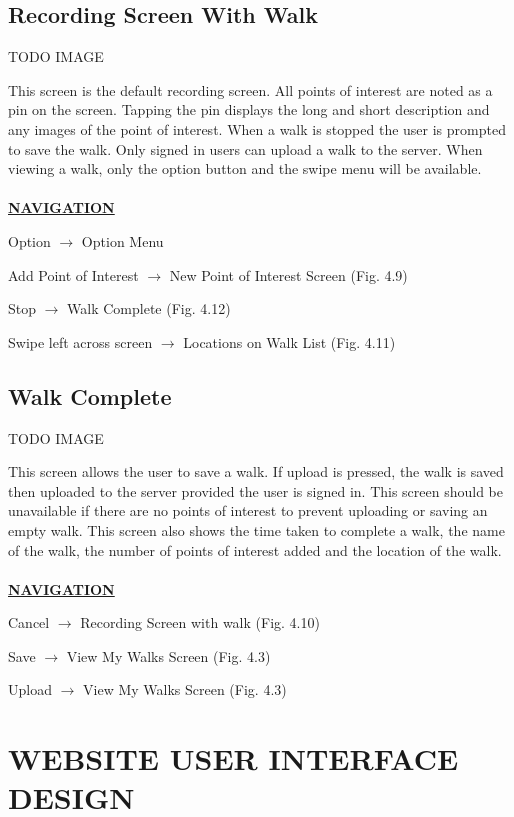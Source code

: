 \documentclass[12pt]{article}
\begin{document}
\subsection{Recording Screen With Walk}
\par{TODO IMAGE}
\par{This screen is the default recording screen. All points of interest are noted as a pin on the screen. Tapping the pin displays the long and short description and any images of the point of interest. When a walk is stopped the user is prompted to save the walk. Only signed in users can upload a walk to the server. When viewing a walk, only the option button and the swipe menu will be available. \\ \\}
\textbf{\uline{NAVIGATION}}
\par{Option $\rightarrow$ Option Menu}
\par{Add Point of Interest $\rightarrow$ New Point of Interest Screen (Fig. 4.9)}
\par{Stop $\rightarrow$ Walk Complete (Fig. 4.12)}
\par{Swipe left across screen $\rightarrow$ Locations on Walk List (Fig. 4.11)}

\subsection{Walk Complete}
\par{TODO IMAGE}
\par{This screen allows the user to save a walk. If upload is pressed, the walk is saved then uploaded to the server provided the user is signed in. This screen should be unavailable if there are no points of interest to prevent uploading or saving an empty walk. This screen also shows the time taken to complete a walk, the name of the walk, the number of points of interest added and the location of the walk. \\ \\}
\textbf{\uline{NAVIGATION}}
\par{Cancel $\rightarrow$ Recording Screen with walk (Fig. 4.10)}
\par{Save $\rightarrow$ View My Walks Screen (Fig. 4.3)}
\par{Upload $\rightarrow$ View My Walks Screen (Fig. 4.3)}
\section{WEBSITE USER INTERFACE DESIGN}
\end{document}

